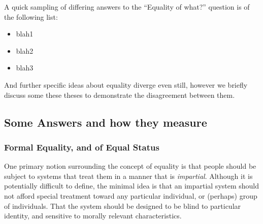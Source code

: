 \documentclass{article}
\begin{document}
A quick sampling of differing answers to the ``Equality of what?'' question is of the following list:
\begin{itemize}
    \item blah1
    \item blah2
    \item blah3
\end{itemize}

And further specific ideas about equality diverge even still, however we briefly discuss some these theses to demonstrate the disagreement between them.

\subsection{Some Answers and how they measure}\label{sec:equality_conflict}

\subsubsection{Formal Equality, and of Equal Status}

One primary notion surrounding the concept of equality is that people should be subject to systems that treat them in a manner that is \textit{impartial}. Although it is potentially difficult to define, the minimal idea is that an impartial system should not afford special treatment toward any particular individual, or (perhaps) group of individuals. That the system should be designed to be blind to particular identity, and sensitive to morally relevant characteristics.
\end{document}
